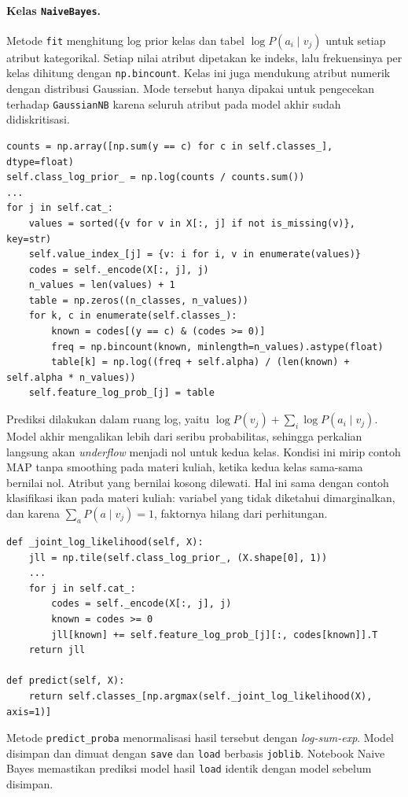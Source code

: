 \paragraph{Kelas \texttt{NaiveBayes}.}
Metode \texttt{fit} menghitung log prior kelas dan tabel
$\log P(a_i \mid v_j)$ untuk setiap atribut kategorikal. Setiap nilai atribut
dipetakan ke indeks, lalu frekuensinya per kelas dihitung dengan
\texttt{np.bincount}. Kelas ini juga mendukung atribut numerik dengan distribusi
Gaussian. Mode tersebut hanya dipakai untuk pengecekan terhadap
\texttt{GaussianNB} karena seluruh atribut pada model akhir sudah didiskritisasi.
\begin{lstlisting}
counts = np.array([np.sum(y == c) for c in self.classes_], dtype=float)
self.class_log_prior_ = np.log(counts / counts.sum())
...
for j in self.cat_:
    values = sorted({v for v in X[:, j] if not is_missing(v)}, key=str)
    self.value_index_[j] = {v: i for i, v in enumerate(values)}
    codes = self._encode(X[:, j], j)
    n_values = len(values) + 1
    table = np.zeros((n_classes, n_values))
    for k, c in enumerate(self.classes_):
        known = codes[(y == c) & (codes >= 0)]
        freq = np.bincount(known, minlength=n_values).astype(float)
        table[k] = np.log((freq + self.alpha) / (len(known) + self.alpha * n_values))
    self.feature_log_prob_[j] = table
\end{lstlisting}

Prediksi dilakukan dalam ruang log, yaitu
$\log P(v_j) + \sum_i \log P(a_i \mid v_j)$. Model akhir mengalikan lebih dari
seribu probabilitas, sehingga perkalian langsung akan \textit{underflow} menjadi nol
untuk kedua kelas. Kondisi ini mirip contoh MAP tanpa smoothing pada materi kuliah,
ketika kedua kelas sama-sama bernilai nol. Atribut yang bernilai kosong dilewati.
Hal ini sama dengan contoh klasifikasi ikan pada materi kuliah: variabel yang tidak
diketahui dimarginalkan, dan karena $\sum_{a} P(a \mid v_j) = 1$, faktornya hilang
dari perhitungan.
\begin{lstlisting}
def _joint_log_likelihood(self, X):
    jll = np.tile(self.class_log_prior_, (X.shape[0], 1))
    ...
    for j in self.cat_:
        codes = self._encode(X[:, j], j)
        known = codes >= 0
        jll[known] += self.feature_log_prob_[j][:, codes[known]].T
    return jll

def predict(self, X):
    return self.classes_[np.argmax(self._joint_log_likelihood(X), axis=1)]
\end{lstlisting}
Metode \texttt{predict\_proba} menormalisasi hasil tersebut dengan
\textit{log-sum-exp}. Model disimpan dan dimuat dengan \texttt{save} dan
\texttt{load} berbasis \texttt{joblib}. Notebook Naive Bayes memastikan prediksi
model hasil \texttt{load} identik dengan model sebelum disimpan.

